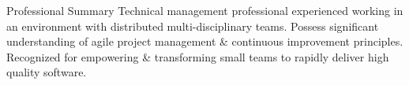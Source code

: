 \documentclass{resume} %
\begin{document}
\vspace{1em}

\begin{rSection}{Professional Summary}
Technical management professional experienced working in an
environment with distributed multi-disciplinary teams. Possess significant
understanding of agile project management \& continuous improvement principles. Recognized for
empowering \& transforming small teams to rapidly deliver high
quality software.
\end{rSection}

\end{document}
